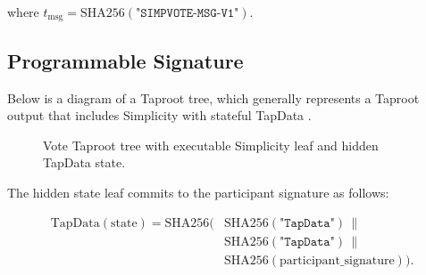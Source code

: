 \documentclass[11pt]{article}
\begin{document}
    where $t_{\mathrm{msg}} = \mathrm{SHA256}(\texttt{"SIMPVOTE-MSG-V1"})$.

    \subsection{Programmable Signature}

    Below is a diagram of a Taproot tree, which generally represents a Taproot output that includes Simplicity with stateful TapData \cite{bip341,simplicity-state}.

    \begin{figure}[ht]
        \centering
        \caption{Vote Taproot tree with executable Simplicity leaf and hidden TapData state.}
    \end{figure}

    The hidden state leaf commits to the participant signature as follows:

    \begin{equation}
        \begin{aligned}
            \mathrm{TapData(state)}
            = \mathrm{SHA256}(&
            \mathrm{SHA256}(\texttt{"TapData"}) \,\|\, \\
            &
            \mathrm{SHA256}(\texttt{"TapData"}) \,\|\, \\
            &
            \mathrm{SHA256}(\mathrm{participant\_signature})
            ).
        \end{aligned}
    \end{equation}
\end{document}
